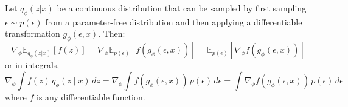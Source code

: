   \begin{theorem}
    Let $q_\phi(z|x)$ be a continuous distribution that can be sampled by first sampling $\epsilon \sim p(\epsilon)$ from a parameter-free distribution and then applying a differentiable transformation $g_\phi(\epsilon, x)$. Then:
    \begin{equation}
       \nabla_\phi \mathbb{E}_{q_\phi(z|x)} [f(z)] = \nabla_\phi \mathbb{E}_{p(\epsilon)} [f(g_\phi(\epsilon, x))] = \mathbb{E}_{p(\epsilon)} [\nabla_\phi f(g_\phi(\epsilon, x))] 
     \end{equation}
    or in integrals, 
    \begin{equation}
     \nabla_\phi \int f(z) \, q_\phi (z \mid x) \,dz = \nabla_\phi \int f(g_\phi (\epsilon, x)) \, p(\epsilon) \,d\epsilon = \int \nabla_\phi f(g_\phi (\epsilon, x)) \, p(\epsilon) \, d\epsilon 
    \end{equation}
    where $f$ is any differentiable function. 
  \end{theorem}
